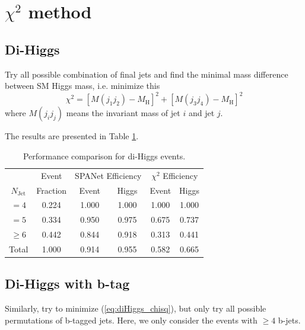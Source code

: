 \documentclass[12pt]{article}
\begin{document}


\section{\texorpdfstring{$\chi^2$}{Chi square} method}%
\label{sec:chi_2_method}
	\subsection{Di-Higgs}%
	\label{sub:di_higgs}
		Try all possible combination of final jets and find the minimal mass difference between SM Higgs mass, i.e. minimize this
		\begin{equation}\label{eq:diHiggs_chisq}
			\chi^2 = [M(j_1j_2)-M_\text{H}]^2 + [M(j_3j_4)-M_\text{H}]^2
		\end{equation}
		where $M(j_ij_j)$ means the invariant mass of jet $i$ and jet $j$.

		The results are presented in Table \ref{tab:comparison_SPANet_and_chi2}.

		\begin{table}[htpb]
			\centering
			\caption{Performance comparison for di-Higgs events.}
			\label{tab:comparison_SPANet_and_chi2}
			\begin{tabular}{c|c|cc|cc}
					  & Event    & \multicolumn{2}{|c|}{SPANet Efficiency} & \multicolumn{2}{|c}{ $\chi^2$ Efficiency} \\
				$N_\text{Jet}$ & Fraction & Event             & Higgs             & Event            & Higgs           \\
				\hline
				$=4$	  &   0.224       &     1.000       &   1.000       &   1.000           &    1.000             \\
				$=5$	  &   0.334       &     0.950       &   0.975       &   0.675           &    0.737            \\
				$\ge 6$	  &   0.442       &     0.844       &   0.918		&   0.313           &    0.441            \\
				Total	  &   1.000       &     0.914       &   0.955       &   0.582           &    0.665            
			\end{tabular}
		\end{table}

	\subsection{Di-Higgs with b-tag}%
	\label{sub:di_higgs_with_b_tag}
		Similarly, try to minimize (\ref{eq:diHiggs_chisq}), but only try all possible permutations of b-tagged jets. Here, we only consider the events with $\ge 4$ b-jets.
\end{document}
